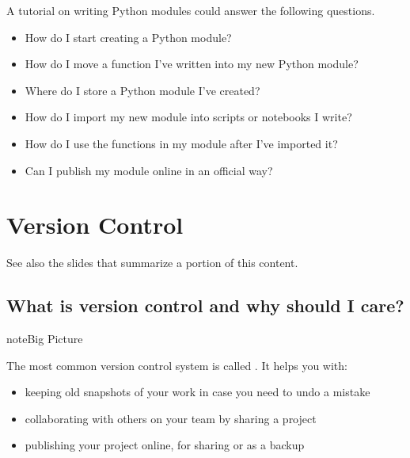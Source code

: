 \documentclass[letterpaper,10pt,english]{sphinxmanual}
\begin{document}
A tutorial on writing Python modules could answer the following questions.
\begin{itemize}
\item {} 
How do I start creating a Python module?

\item {} 
How do I move a function I’ve written into my new Python module?

\item {} 
Where do I store a Python module I’ve created?

\item {} 
How do I import my new module into scripts or notebooks I write?

\item {} 
How do I use the functions in my module after I’ve imported it?

\item {} 
Can I publish my module online in an official way?

\end{itemize}


\chapter{Version Control}
\label{\detokenize{chapter-8-version-control:version-control}}\label{\detokenize{chapter-8-version-control::doc}}
See also the slides that summarize a portion of this content.


\section{What is version control and why should I care?}
\label{\detokenize{chapter-8-version-control:what-is-version-control-and-why-should-i-care}}
\begin{sphinxadmonition}{note}{Big Picture}

The most common version control system is called .  It helps you with:
\begin{itemize}
\item {} 
keeping old snapshots of your work in case you need to undo a mistake

\item {} 
collaborating with others on your team by sharing a project

\item {} 
publishing your project online, for sharing or as a backup

\end{itemize}
\end{sphinxadmonition}
\end{document}
